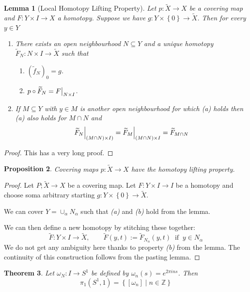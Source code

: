 \documentclass[11pt]{article}
\newcommand{\defeq}{:=}
\newcommand\restr[2]{{%
  \left.\kern-\nulldelimiterspace %
  #1 %
  \vphantom{\big|} %
  \right|_{#2} %
  }}
\newcommand{\relmiddle}[1]{\mathrel{}\middle#1\mathrel{}}
\newcommand{\rmv}{\relmiddle|}
\newcommand{\Z}{\mathbb{Z}}
\newtheorem{theorem}{Theorem}[section]
\newtheorem{prop}[theorem]{Proposition}
\newtheorem{lemma}[theorem]{Lemma}
\begin{document}
\begin{lemma}[Local Homotopy Lifting Property]
Let $p:\widetilde{X}\to X$ be a covering map and $F:Y\times I \to X$ a homotopy.
Suppose we have $g:Y\times\left\{0\right\}\to \widetilde{X}$.
Then for every $y\in Y$
\begin{enumerate}[label=(\alph*)]
	\item There exists an open neighbourhood $N\subseteq Y$ and a unique homotopy $\widetilde{F}_N:N\times I \to \widetilde{X}$ such that
		\begin{enumerate}[label=(\roman*)]
			\item $(\widetilde{f}_N)_0=g$.
			\item $p\circ\widetilde{F}_N=\restr{F}{N\times I}$.
		\end{enumerate}
	\item If $M\subseteq Y$ with $y\in M$ is another open neighbourhood for which \textit{(a)} holds then \textit{(a)} also holds for $M\cap N$ and
		\[
			\restr{\widetilde{F}_N}{(M\cap N)\times I)}=\restr{\widetilde{F}_M}{(M\cap N)\times I}=\widetilde{F}_{M\cap N}
		\]
\end{enumerate}
\end{lemma}
\begin{proof}
This has a very long proof.
\end{proof}

\begin{prop}
Covering maps $p:\widetilde{X}\to X$ have the homotopy lifting property.
\end{prop}

\begin{proof}
Let $P;\widetilde{X}\to X$ be a covering map.
Let $F:Y\times I \to I$ be a homotopy and choose soma arbitrary starting $g:Y\times\left\{0\right\}\to\widetilde{X}$.

We can cover $Y=\cup_\alpha N_\alpha$ such that \textit{(a)} and \textit{(b)} hold from the lemma.

We can then define a new homotopy by stitching these together:
\[
	\widetilde{F}:Y\times I \to \widetilde{X},\quad\quad \widetilde{F}(y, t)\defeq \widetilde{F}_{N_\alpha}(y, t)\;\;\text{if}\;\; y\in N_\alpha
\]
We do not get any ambiguity here thanks to property \textit{(b)} from the lemma.
The continuity of this construction follows from the pasting lemma.
\end{proof}

\begin{theorem}
Let $\omega_N:I\to S^1$ be defined by $\omega_n(s)=e^{2\pi i n s}$. Then
\[
	\pi_1(S^1,1)=\left\{[\omega_n] \rmv n\in\Z\right\}
\]
\end{theorem}
\end{document}
